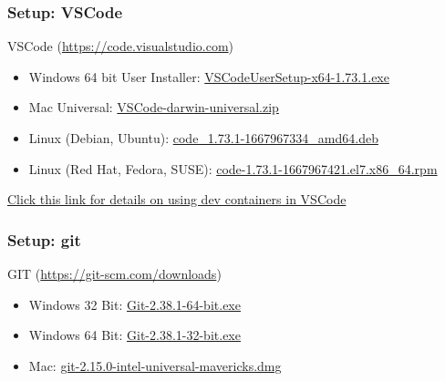 \documentclass[aspectratio=169]{beamer}
\begin{document}
\begin{frame}
	\frametitle{Setup: VSCode}
	VSCode (\href{https://code.visualstudio.com}{https://code.visualstudio.com})
	\begin{itemize}
		\item Windows 64 bit User Installer: \href{https://prereqs.codemash.org/Files/VVSCodeUserSetup-x64-1.73.1.exe}{VSCodeUserSetup-x64-1.73.1.exe}
		\item Mac Universal: \href{https://prereqs.codemash.org/Files/VSCode-darwin-universal.zip}{VSCode-darwin-universal.zip}
		\item Linux (Debian, Ubuntu): \href{https://prereqs.codemash.org/Files/code_1.73.1-1667967334_amd64.deb}{code\_1.73.1-1667967334\_amd64.deb}
		\item  Linux (Red Hat, Fedora, SUSE): \href{https://prereqs.codemash.org/Files/code-1.73.1-1667967421.el7.x86_64.rpm}{code-1.73.1-1667967421.el7.x86\_64.rpm}
	\end{itemize}
	\vspace{2mm}
	\href{https://code.visualstudio.com/docs/devcontainers/containers}{Click this link for details on using dev containers in VSCode}
\end{frame}

\begin{frame}
	\frametitle{Setup: git}
	GIT (\href{https://git-scm.com/downloads}{https://git-scm.com/downloads})
	\begin{itemize}
		\item Windows 32 Bit: \href{https://prereqs.codemash.org/Files/Git-2.38.1-64-bit.exe}{Git-2.38.1-64-bit.exe}
		\item Windows 64 Bit: \href{https://prereqs.codemash.org/Files/Git-2.38.1-32-bit.exe}{Git-2.38.1-32-bit.exe}
		\item Mac: \href{https://prereqs.codemash.org/Files/git-2.15.0-intel-universal-mavericks.dmg}{git-2.15.0-intel-universal-mavericks.dmg}
	\end{itemize}
\end{frame}
\end{document}
